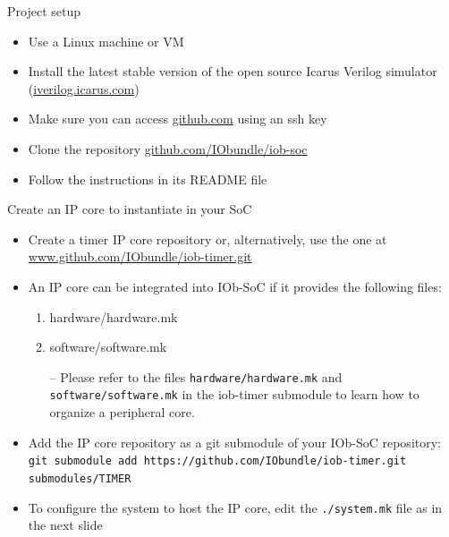 \documentclass [xcolor=svgnames, t] {beamer}
\begin{document}
\begin{frame}{Project setup}
\begin{center}
  \begin{itemize}
    \item Use a Linux machine or VM
    \item Install the latest stable version of the open source Icarus Verilog simulator (\url{iverilog.icarus.com})
    \item Make sure you can access \url{github.com} using an ssh key
    \item Clone the repository \url{github.com/IObundle/iob-soc}
    \item Follow the instructions in its README file
  \end{itemize}
\end{center}
\end{frame}


\begin{frame}{Create an IP core to instantiate in your SoC}
  \begin{itemize}
  \item Create a timer IP core repository or, alternatively, use the one at \url{www.github.com/IObundle/iob-timer.git}
  \item An IP core can be integrated into IOb-SoC if it provides the following files: 
    \begin{enumerate}
    \item hardware/hardware.mk
    \item software/software.mk
    \end{enumerate}
    \begin{itemize}
      \item[--] Please refer to the files {\tt hardware/hardware.mk} and {\tt software/software.mk} in the iob-timer submodule to learn how to organize a peripheral core.
    \end{itemize}
  \item Add the IP core repository as a git submodule of your IOb-SoC repository:\\
    {\tiny \tt git submodule add https://github.com/IObundle/iob-timer.git submodules/TIMER}
  \item To configure the system to host the IP core, edit the {\tt ./system.mk} file as in the next slide
  \end{itemize}
\end{frame}

\lstset{basicstyle=\ttfamily,columns=fullflexible}
\end{document}

